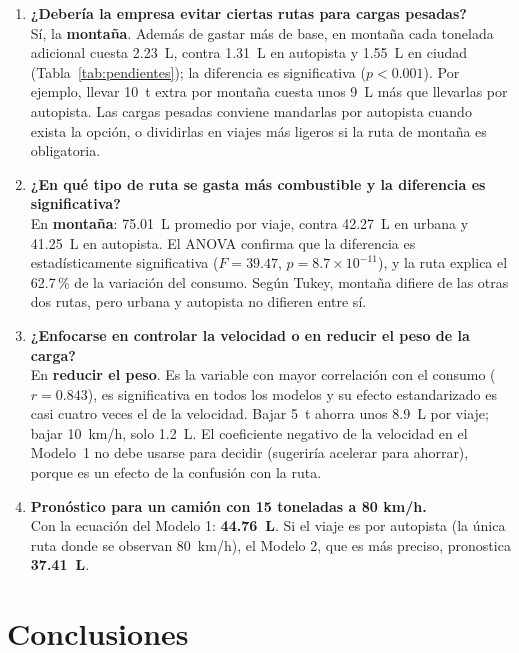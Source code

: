 \documentclass[12pt,letterpaper]{article}
\begin{document}
\begin{enumerate}[itemsep=6pt]
  \item \textbf{¿Debería la empresa evitar ciertas rutas para cargas pesadas?}\\
  Sí, la \textbf{montaña}. Además de gastar más de base, en montaña cada tonelada adicional cuesta 2.23~L, contra 1.31~L en autopista y 1.55~L en ciudad (Tabla~\ref{tab:pendientes}); la diferencia es significativa ($p < 0.001$). Por ejemplo, llevar 10~t extra por montaña cuesta unos 9~L más que llevarlas por autopista. Las cargas pesadas conviene mandarlas por autopista cuando exista la opción, o dividirlas en viajes más ligeros si la ruta de montaña es obligatoria.

  \item \textbf{¿En qué tipo de ruta se gasta más combustible y la diferencia es significativa?}\\
  En \textbf{montaña}: 75.01~L promedio por viaje, contra 42.27~L en urbana y 41.25~L en autopista. El ANOVA confirma que la diferencia es estadísticamente significativa ($F = 39.47$, $p = 8.7 \times 10^{-11}$), y la ruta explica el 62.7\,\% de la variación del consumo. Según Tukey, montaña difiere de las otras dos rutas, pero urbana y autopista no difieren entre sí.

  \item \textbf{¿Enfocarse en controlar la velocidad o en reducir el peso de la carga?}\\
  En \textbf{reducir el peso}. Es la variable con mayor correlación con el consumo ($r = 0.843$), es significativa en todos los modelos y su efecto estandarizado es casi cuatro veces el de la velocidad. Bajar 5~t ahorra unos 8.9~L por viaje; bajar 10~km/h, solo 1.2~L. El coeficiente negativo de la velocidad en el Modelo~1 no debe usarse para decidir (sugeriría acelerar para ahorrar), porque es un efecto de la confusión con la ruta.

  \item \textbf{Pronóstico para un camión con 15 toneladas a 80 km/h.}\\
  Con la ecuación del Modelo 1: \textbf{44.76~L}. Si el viaje es por autopista (la única ruta donde se observan 80~km/h), el Modelo 2, que es más preciso, pronostica \textbf{37.41~L}.
\end{enumerate}

\section{Conclusiones}
\end{document}
